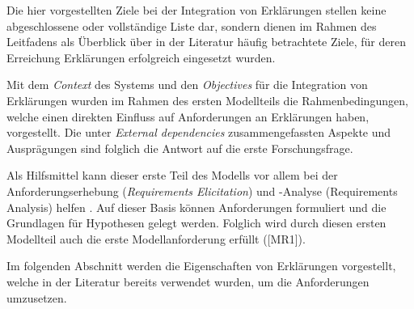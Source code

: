 \bigskip

Die hier vorgestellten Ziele bei der Integration von Erklärungen stellen keine abgeschlossene oder vollständige Liste dar, sondern dienen im Rahmen des Leitfadens als Überblick über in der Literatur häufig betrachtete Ziele, für deren Erreichung Erklärungen erfolgreich eingesetzt wurden.

\smallskip

\noindent{}

\smallskip

Mit dem \textit{Context} des Systems und den \textit{Objectives} für die Integration von Erklärungen wurden im Rahmen des ersten Modellteils die Rahmenbedingungen, welche einen direkten Einfluss auf Anforderungen an Erklärungen haben, vorgestellt. Die unter \textit{External dependencies} zusammengefassten Aspekte und Ausprägungen sind folglich die Antwort auf die erste Forschungsfrage.

Als Hilfsmittel kann dieser erste Teil des Modells vor allem bei der Anforderungserhebung (\textit{Requirements Elicitation}) und -Analyse (Requirements Analysis) helfen \cite{schneider2012abenteuer}. Auf dieser Basis können Anforderungen formuliert und die Grundlagen für Hypothesen gelegt werden. Folglich wird durch diesen ersten Modellteil auch die erste Modellanforderung erfüllt ([MR1]).

\smallskip

Im folgenden Abschnitt werden die Eigenschaften von Erklärungen vorgestellt, welche in der Literatur bereits verwendet wurden, um die Anforderungen umzusetzen.
